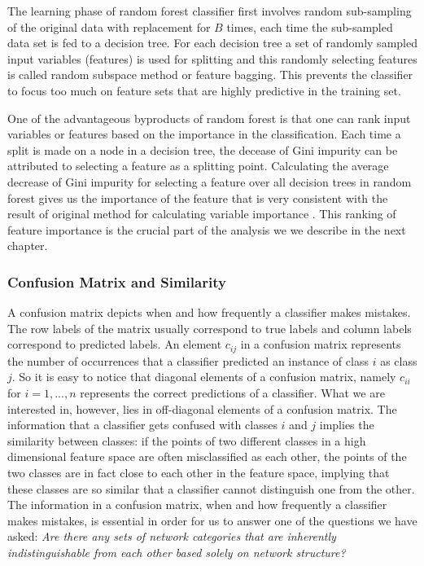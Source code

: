 \documentclass{article}
\begin{document}
The learning phase of random forest classifier first involves random sub-sampling of the original data with replacement for $B$ times, each time the sub-sampled data set is fed to a decision tree. For each decision tree a set of randomly sampled input variables (features) is used for splitting and this randomly selecting features is called random subspace method or feature bagging. This prevents the classifier to focus too much on feature sets that are highly predictive in the training set. 

One of the advantageous byproducts of random forest is that one can rank input variables or features based on the importance in the classification. Each time a split is made on a node in a decision tree, the decease of Gini impurity can be attributed to selecting a feature as a splitting point.  Calculating the average decrease of Gini impurity for selecting a feature over all decision trees in random forest gives us the importance of the feature that is very consistent with the result of original method for calculating variable importance \cite{RandomForest,RandomForestOnline}. This ranking of feature importance is the crucial part of the analysis we we describe in the next chapter.


		\subsubsection{Confusion Matrix and Similarity}
	A confusion matrix depicts when and how frequently a classifier makes mistakes. The row labels of the matrix usually correspond to  true labels and column labels correspond to predicted labels. An element $c_{ij}$ in a confusion matrix represents the number of occurrences that a classifier predicted an instance of class $i$ as class $j$. So it is easy to notice that diagonal elements of a confusion matrix, namely $c_{ii}$ for $i = 1,...,n$ represents the correct predictions of a classifier. What we are interested in, however, lies in off-diagonal elements of a confusion matrix. The information that a classifier gets confused with classes $i$ and $j$ implies the similarity between classes: if the points of two different classes in a high dimensional feature space are often misclassified as each other, the points of the two classes are in fact close to each other in the feature space, implying that these classes are so similar that a classifier cannot distinguish one from the other. The information in a confusion matrix, when and how frequently a classifier makes mistakes, is essential in order for us to answer one of the questions we have asked: \textit{Are there any sets of network categories that are inherently indistinguishable from each other based solely on network structure?}
\end{document}
